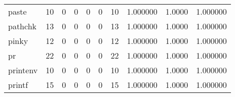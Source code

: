 \begin{longtable}{lrrrrrrrrr}
paste     &                                       10 &                                                  0 &                                                  0 &                                                  0 &                                                  0 &                                                 10 &                                           1.000000 &                                 1.0000 &                             1.000000 \\
pathchk   &                                       13 &                                                  0 &                                                  0 &                                                  0 &                                                  0 &                                                 13 &                                           1.000000 &                                 1.0000 &                             1.000000 \\
pinky     &                                       12 &                                                  0 &                                                  0 &                                                  0 &                                                  0 &                                                 12 &                                           1.000000 &                                 1.0000 &                             1.000000 \\
pr        &                                       22 &                                                  0 &                                                  0 &                                                  0 &                                                  0 &                                                 22 &                                           1.000000 &                                 1.0000 &                             1.000000 \\
printenv  &                                       10 &                                                  0 &                                                  0 &                                                  0 &                                                  0 &                                                 10 &                                           1.000000 &                                 1.0000 &                             1.000000 \\
printf    &                                       15 &                                                  0 &                                                  0 &                                                  0 &                                                  0 &                                                 15 &                                           1.000000 &                                 1.0000 &                             1.000000 \\

\end{longtable}

